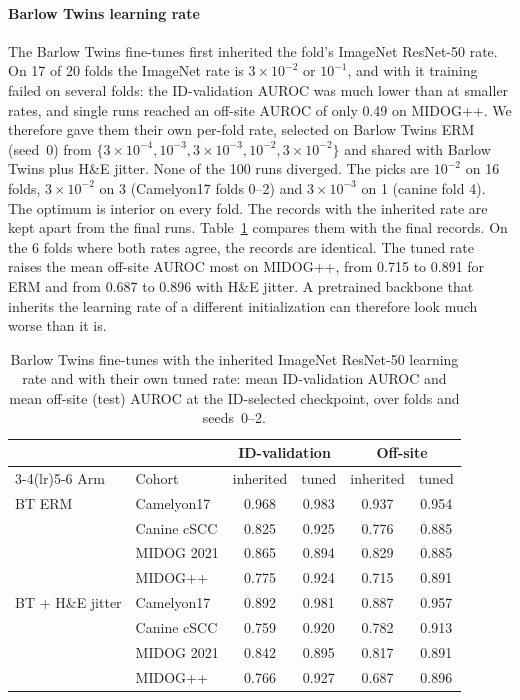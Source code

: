 \paragraph{Barlow Twins learning rate}
\label{app:tuning-bt}
The Barlow Twins fine-tunes first inherited the fold's ImageNet ResNet-50 rate.
On 17 of 20 folds the ImageNet rate is $3\times10^{-2}$ or $10^{-1}$, and with it
training failed on several folds: the ID-validation AUROC was much lower than
at smaller rates, and single runs reached an off-site AUROC of only 0.49 on
MIDOG++. We therefore gave them their own per-fold rate,
selected on Barlow Twins ERM (seed~0) from
$\{3\times10^{-4},10^{-3},3\times10^{-3},10^{-2},3\times10^{-2}\}$ and shared
with Barlow Twins plus H\&E jitter. None of the 100 runs diverged. The picks
are $10^{-2}$ on 16 folds, $3\times10^{-2}$ on 3 (Camelyon17 folds 0--2) and
$3\times10^{-3}$ on 1 (canine fold 4). The optimum is interior on every fold. The
records with the inherited rate are kept apart from the final runs.
Table~\ref{tab:tuning-bt} compares them with the final records. On the 6 folds
where both rates agree, the records are identical. The tuned rate raises the
mean off-site AUROC most on MIDOG++, from 0.715 to 0.891 for ERM and from 0.687
to 0.896 with H\&E jitter. A pretrained backbone that inherits the learning
rate of a different initialization can therefore look much worse than it is.

\begin{table}[width=\linewidth,pos=t]
\caption{Barlow Twins fine-tunes with the inherited ImageNet ResNet-50
learning rate and with their own tuned rate: mean ID-validation AUROC and
mean off-site (test) AUROC at the ID-selected checkpoint, over folds and
seeds~0--2.}
\label{tab:tuning-bt}
\footnotesize
\begin{tabular*}{\tblwidth}{@{\extracolsep{\fill}}llcccc@{}}
\toprule
 & & \multicolumn{2}{c}{ID-validation} & \multicolumn{2}{c}{Off-site} \\
\cmidrule(lr){3-4}\cmidrule(lr){5-6}
Arm & Cohort & inherited & tuned & inherited & tuned \\
\midrule
BT ERM & Camelyon17 & 0.968 & 0.983 & 0.937 & 0.954 \\
 & Canine cSCC & 0.825 & 0.925 & 0.776 & 0.885 \\
 & MIDOG 2021 & 0.865 & 0.894 & 0.829 & 0.885 \\
 & MIDOG++ & 0.775 & 0.924 & 0.715 & 0.891 \\
\addlinespace
BT + H\&E jitter & Camelyon17 & 0.892 & 0.981 & 0.887 & 0.957 \\
 & Canine cSCC & 0.759 & 0.920 & 0.782 & 0.913 \\
 & MIDOG 2021 & 0.842 & 0.895 & 0.817 & 0.891 \\
 & MIDOG++ & 0.766 & 0.927 & 0.687 & 0.896 \\
\bottomrule
\end{tabular*}
\end{table}

